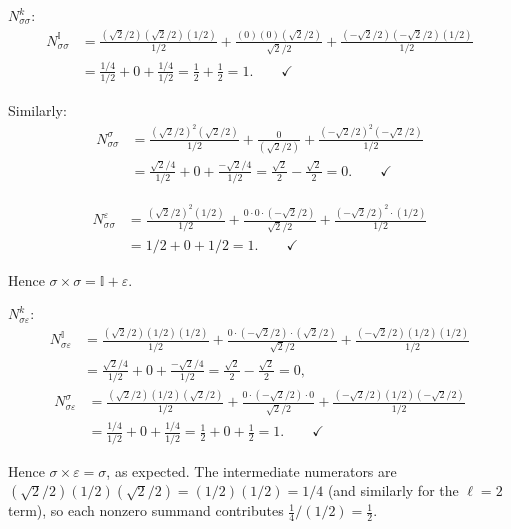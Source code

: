 \begin{computation}
$N_{\sigma\sigma}^k$:
\begin{align*}
N_{\sigma\sigma}^{\mathbb{I}}
&= \frac{(\sqrt{2}/2)(\sqrt{2}/2)(1/2)}{1/2}
+ \frac{(0)(0)(\sqrt{2}/2)}{\sqrt{2}/2}
+ \frac{(-\sqrt{2}/2)(-\sqrt{2}/2)(1/2)}{1/2} \\
&= \frac{1/4}{1/2} + 0 + \frac{1/4}{1/2} = \frac{1}{2} + \frac{1}{2} = 1. \qquad \checkmark
\end{align*}

Similarly:
\begin{align*}
N_{\sigma\sigma}^{\sigma}
&= \frac{(\sqrt{2}/2)^2(\sqrt{2}/2)}{1/2}
+ \frac{0}{(\sqrt{2}/2)}
+ \frac{(-\sqrt{2}/2)^2(-\sqrt{2}/2)}{1/2} \\
&= \frac{\sqrt{2}/4}{1/2} + 0 + \frac{-\sqrt{2}/4}{1/2}
= \frac{\sqrt{2}}{2} - \frac{\sqrt{2}}{2} = 0. \qquad \checkmark
\end{align*}

\begin{align*}
N_{\sigma\sigma}^{\varepsilon}
&= \frac{(\sqrt{2}/2)^2(1/2)}{1/2}
+ \frac{0 \cdot 0 \cdot (-\sqrt{2}/2)}{\sqrt{2}/2}
+ \frac{(-\sqrt{2}/2)^2 \cdot (1/2)}{1/2} \\
&= 1/2 + 0 + 1/2 = 1. \qquad \checkmark
\end{align*}

Hence $\sigma \times \sigma = \mathbb{I} + \varepsilon$.

$N_{\sigma\varepsilon}^k$:
\begin{align*}
N_{\sigma\varepsilon}^{\mathbb{I}}
&= \frac{(\sqrt{2}/2)(1/2)(1/2)}{1/2}
+ \frac{0 \cdot (-\sqrt{2}/2) \cdot (\sqrt{2}/2)}{\sqrt{2}/2}
+ \frac{(-\sqrt{2}/2)(1/2)(1/2)}{1/2} \\
&= \frac{\sqrt{2}/4}{1/2} + 0 + \frac{-\sqrt{2}/4}{1/2}
= \frac{\sqrt{2}}{2} - \frac{\sqrt{2}}{2} = 0,
\end{align*}
\begin{align*}
N_{\sigma\varepsilon}^{\sigma}
&= \frac{(\sqrt{2}/2)(1/2)(\sqrt{2}/2)}{1/2}
+ \frac{0 \cdot (-\sqrt{2}/2) \cdot 0}{\sqrt{2}/2}
+ \frac{(-\sqrt{2}/2)(1/2)(-\sqrt{2}/2)}{1/2} \\
&= \frac{1/4}{1/2} + 0 + \frac{1/4}{1/2} = \frac{1}{2} + 0 + \frac{1}{2} = 1. \qquad \checkmark
\end{align*}

Hence $\sigma \times \varepsilon = \sigma$, as expected.
The intermediate numerators are
$(\sqrt{2}/2)(1/2)(\sqrt{2}/2) = (1/2)(1/2) = 1/4$
(and similarly for the $\ell = 2$ term), so each nonzero
summand contributes $\tfrac{1}{4}/(1/2) = \tfrac{1}{2}$.
\end{computation}

